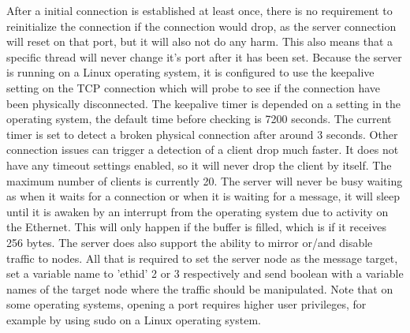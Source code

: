 \noindent After a initial connection is established at least once, there is no requirement to reinitialize the connection if the connection would drop, as the server connection will reset on that port, but it will also not do any harm. This also means that a specific thread will never change it's port after it has been set. Because the server is running on a Linux operating system, it is configured to use the keepalive setting on the TCP connection which will probe to see if the connection have been physically disconnected. The keepalive timer is depended on a setting in the operating system, the default time before checking is 7200 seconds. The current timer is set to detect a broken physical connection after around 3 seconds. Other connection issues can trigger a detection of a client drop much faster. It does not have any timeout settings enabled, so it will never drop the client by itself. The maximum number of clients is currently 20. The server will never be busy waiting as when it waits for a connection or when it is waiting for a message, it will sleep until it is awaken by an interrupt from the operating system due to activity on the Ethernet. This will only happen if the buffer is filled, which is if it receives 256 bytes. The server does also support the ability to mirror or/and disable traffic to nodes. All that is required to set the server node as the message target, set a variable name to 'ethid' 2 or 3 respectively and send boolean with a variable names of the target node where the traffic should be manipulated. Note that on some operating systems, opening a port requires higher user privileges, for example by using sudo on a Linux operating system.

